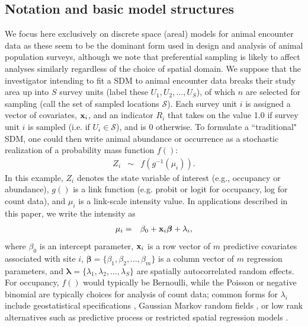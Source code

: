 \documentclass[times,mee,doublespace,]{besauth2}
\begin{document}
\subsection{Notation and basic model structures}

We focus here exclusively on discrete space (areal) models for animal encounter data as these seem to be the dominant form used in design and analysis of animal population surveys, although we note that preferential sampling is likely to affect analyses similarly regardless of the choice of spatial domain.  We suppose that the investigator intending to fit a SDM to animal encounter data breaks their study area up into $S$ survey units (label these $U_1, U_2, \hdots, U_S$), of which $n$ are selected for sampling (call the set of sampled locations $\mathcal{S}$). Each survey unit $i$ is assigned a vector of covariates, ${\bf x}_i$, and an indicator $R_i$ that takes on the value 1.0 if survey unit $i$ is sampled (i.e. if $U_i \in \mathcal{S}$), and is 0 otherwise.  To formulate a ``traditional" SDM, one could then write animal abundance or occurrence as a stochastic realization of a probability mass function $f()$:
\begin{eqnarray}
  \label{eq:process}
  Z_i & \sim & f(g^{-1}(\mu_i)).
\end{eqnarray}
In this example, $Z_i$ denotes the state variable of interest (e.g., occupancy or abundance), $g()$ is a link function (e.g. probit or logit for occupancy, log for count data), and $\mu_i$ is a link-scale intensity value.  In applications described in this paper, we write the intensity as
\begin{eqnarray}
\mu_i & = & \beta_0 + {\bf x}_i \boldsymbol{\beta}+\lambda_i,
 \label{eq:mu}
\end{eqnarray}
where $\beta_0$ is an intercept parameter, ${\bf x}_i$ is a row vector of $m$ predictive covariates associated with site $i$, $\boldsymbol{\beta} = \{ \beta_1, \beta_2, \hdots, \beta_m \}$ is a column vector of $m$ regression parameters, and $\boldsymbol{\lambda}=\{ \lambda_1,\lambda_2,\hdots,\lambda_S \}$ are spatially autocorrelated random effects.  For occupancy, $f()$ would typically be Bernoulli, while the Poisson or negative binomial are typically choices for analysis of count data; common forms for $\lambda_i$ include geostatistical specifications \citep{Cressie1993,DiggleEtAl1998}, Gaussian Markov random fields \citep[e.g. conditionally autoregressive models;][]{RueHeld2005}, or low rank alternatives such as predictive process \citep{BanerjeeEtAl2008,LatimerEtAl2009} or restricted spatial regression models \citep{Reich2006,Hughes2013}.
\end{document}
